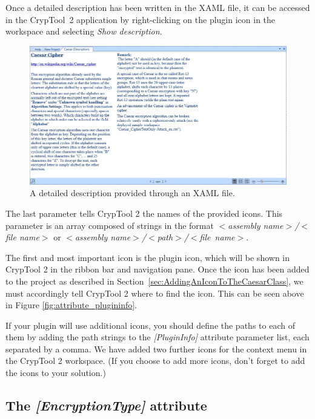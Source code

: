 Once a detailed description has been written in the XAML file, it can be accessed in the CrypTool~2 application by right-clicking on the plugin icon in the workspace and selecting \textit{Show description}.

\begin{figure}[h!]
	\centering
		\includegraphics[width=1.00\textwidth]{figures/xaml_description.jpg}
	\caption{A detailed description provided through an XAML file.}
	\label{fig:xaml_description}
\end{figure}
\clearpage

The last parameter tells CrypTool 2 the names of the provided icons. This parameter is an array composed of strings in the format \textit{$<$assembly name$>$/$<$file name$>$} or \textit{$<$assembly name$>$/$<$path$>$/\linebreak $<$file~name$>$}.

The first and most important icon is the plugin icon, which will be shown in CrypTool 2 in the ribbon bar and navigation pane. Once the icon has been added to the project as described in Section~\ref{sec:AddingAnIconToTheCaesarClass}, we must accordingly tell CrypTool 2 where to find the icon. This can be seen above in Figure \ref{fig:attribute_plugininfo}.

If your plugin will use additional icons, you should define the paths to each of them by adding the path strings to the \textit{[PluginInfo]} attribute parameter list, each separated by a comma. We have added two further icons for the context menu in the CrypTool 2 workspace. (If you choose to add more icons, don't forget to add the icons to your solution.)

\subsection{The \protect\textit{[EncryptionType]} attribute}
\label{sec:TheEncryptionTypeAttribute}

